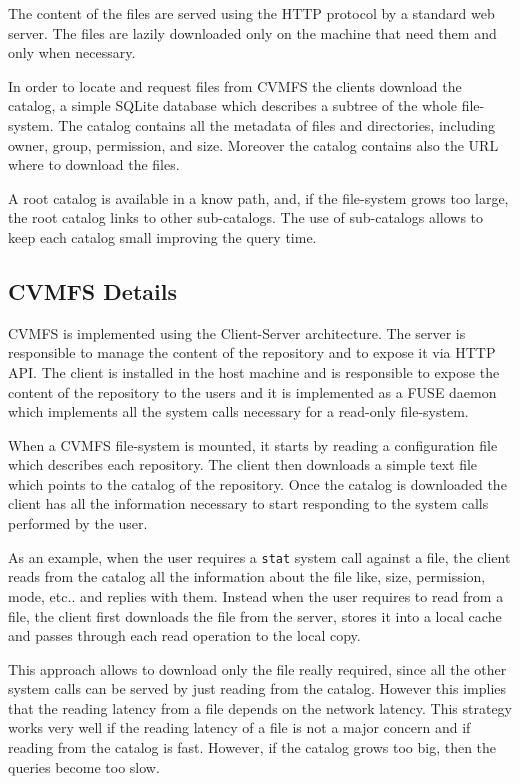 The content of the files are served using the HTTP protocol by a standard
web server. The files are lazily downloaded only on the machine that need them
and only when necessary.

In order to locate and request files from CVMFS the clients download the
catalog, a simple SQLite database which describes a subtree of the whole
file-system.  The catalog contains all the metadata of files and directories,
including owner, group, permission, and size. Moreover the catalog contains
also the URL where to download the files.

A root catalog is available in a know path, and, if the file-system grows too
large, the root catalog links to other sub-catalogs. The use of sub-catalogs
allows to keep each catalog small improving the query time.

\subsection{CVMFS Details}\label{subsec:cvmfs-details}

CVMFS is implemented using the Client-Server architecture. The server is
responsible to manage the content of the repository and to expose it via HTTP
API.  The client is installed in the host machine and is responsible to expose
the content of the repository to the users and it is implemented as a FUSE
daemon which implements all the system calls necessary for a read-only
file-system.

When a CVMFS file-system is mounted, it starts by reading a configuration file
which describes each repository. The client then downloads a simple text file
which points to the catalog of the repository. Once the catalog is downloaded
the client has all the information necessary to start responding to the system
calls performed by the user.

As an example, when the user requires a \texttt{stat} system call against a
file, the client reads from the catalog all the information about the file
like, size, permission, mode, etc.. and replies with them. Instead when the
user requires to read from a file, the client first downloads the file from the
server, stores it into a local cache and passes through each read operation to
the local copy.

This approach allows to download only the file really required, since all the
other system calls can be served by just reading from the catalog. However this
implies that the reading latency from a file depends on the network latency.
This strategy works very well if the reading latency of a file is not a major
concern and if reading from the catalog is fast. However, if the catalog grows
too big, then the queries become too slow. 

